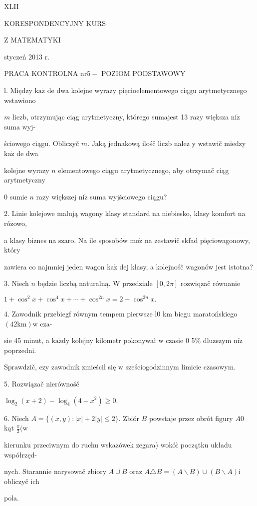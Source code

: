 \documentclass[a4paper,12pt]{article}
\begin{document}
XLII

KORESPONDENCYJNY KURS

Z MATEMATYKI

styczeń 2013 r.

PRACA KONTROLNA $\mathrm{n}\mathrm{r} 5-$ POZIOM PODSTAWOWY

l. Między $\mathrm{k}\mathrm{a}\dot{\mathrm{z}}$ de dwa kolejne wyrazy pięcioelementowego ciągu arytmetycznego wstawiono

$m$ liczb, otrzymując ciąg arytmetyczny, którego sumajest 13 razy większa $\mathrm{n}\mathrm{i}\dot{\mathrm{z}}$ suma wyj-

ściowego ciągu. Obliczyč $m$. Jaką jednakową ilośč liczb nalez $\mathrm{y}$ wstawič miedzy $\mathrm{k}\mathrm{a}\dot{\mathrm{z}}$ de dwa

kolejne wyrazy $n$ elementowego ciągu arytmetycznego, aby otrzymač ciąg arytmetyczny

$0$ sumie $n$ razy większej $\mathrm{n}\mathrm{i}\dot{\mathrm{z}}$ suma wyjściowego ciągu?

2. Linie kolejowe malują wagony klasy standard na niebiesko, klasy komfort na rózowo,

a klasy biznes na szaro. Na ile sposobów $\mathrm{m}\mathrm{o}\dot{\mathrm{z}}$ na zestawič skfad pięciowagonowy, który

zawiera co najmniej jeden wagon $\mathrm{k}\mathrm{a}\dot{\mathrm{z}}$ dej klasy, a kolejnośč wagonów jest istotna?

3. Niech $n$ będzie liczbą naturalną. $\mathrm{W}$ przedziale $[0,2\pi]$ rozwiqzač równanie

$1+\cos^{2}x+\cos^{4}x+\cdots+\cos^{2n}x=2-\cos^{2n}x.$

4. Zawodnik przebiegf równym tempem pierwsze l0 km biegu maratońskiego $(42\mathrm{k}\mathrm{m})\mathrm{w}$ cza-

sie 45 minut, a $\mathrm{k}\mathrm{a}\dot{\mathrm{z}}\mathrm{d}\mathrm{y}$ kolejny kilometr pokonywał $\mathrm{w}$ czasie $0$ 5\% dluzszym $\mathrm{n}\mathrm{i}\dot{\mathrm{z}}$ poprzedni.

Sprawdzič, czy zawodnik zmieścil się $\mathrm{w}$ sześciogodzinnym limicie czasowym.

5. Rozwiązač nierównośč

$\log_{2}(x+2)-\log_{4}(4-x^{2})\geq 0.$

6. Niech $A=\{(x,y):|x|+2|y|\leq 2\}$. Zbiór $B$ powstaje przez obrót figury $A0$ kąt $\displaystyle \frac{\pi}{2} (\mathrm{w}$

kierunku przeciwnym do ruchu wskazówek zegara) wokół początku układu współrzęd-

nych. Starannie narysowač zbiory $A\cup B$ oraz $A\triangle B=(A\backslash B)\cup(B\backslash A)\mathrm{i}$ obliczyč ich

pola.
\end{document}
